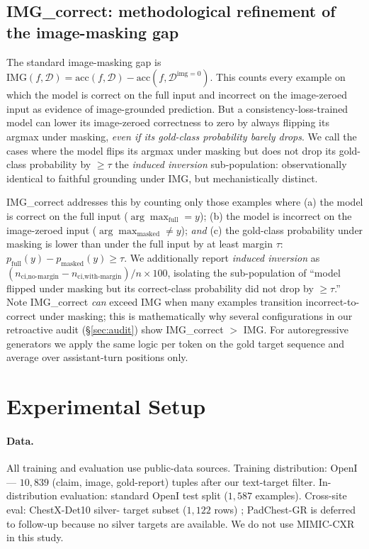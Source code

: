 \documentclass{article}
\begin{document}
\subsection{IMG\_correct: methodological refinement of the image-masking gap}
\label{sec:imgcorrect}

The standard image-masking gap is
$\mathrm{IMG}(f, \mathcal{D}) = \mathrm{acc}(f, \mathcal{D}) - \mathrm{acc}(f, \mathcal{D}^{\mathrm{img}=0})$.
This counts every example on which the model is correct on the full input
and incorrect on the image-zeroed input as evidence of image-grounded
prediction. But a consistency-loss-trained model can lower its image-zeroed
correctness to zero by always flipping its argmax under masking,
\emph{even if its gold-class probability barely drops}. We call the cases
where the model flips its argmax under masking but does not drop its
gold-class probability by $\geq\tau$ the \emph{induced inversion}
sub-population: observationally identical to faithful grounding under IMG,
but mechanistically distinct.

IMG\_correct addresses this by counting only those examples where (a) the
model is correct on the full input ($\arg\max_{\mathrm{full}} = y$);
(b) the model is incorrect on the image-zeroed input
($\arg\max_{\mathrm{masked}} \neq y$); \emph{and} (c) the gold-class
probability under masking is lower than under the full input by at least
margin $\tau$:
$p_{\mathrm{full}}(y) - p_{\mathrm{masked}}(y) \geq \tau$. We additionally
report \emph{induced inversion} as
$(n_{\text{ci,no-margin}} - n_{\text{ci,with-margin}})/n \times 100$,
isolating the sub-population of ``model flipped under masking but its
correct-class probability did not drop by $\geq\tau$.'' Note IMG\_correct
\emph{can} exceed IMG when many examples transition incorrect-to-correct
under masking; this is mathematically why several configurations in our
retroactive audit (\S\ref{sec:audit}) show IMG\_correct $>$ IMG. For
autoregressive generators we apply the same logic per token on the gold
target sequence and average over assistant-turn positions only.

\section{Experimental Setup}
\label{sec:setup}

\paragraph{Data.} All training and evaluation use public-data sources. Training distribution: OpenI
\citep{demner2016openi} --- $10{,}839$ (claim, image, gold-report) tuples
after our text-target filter. In-distribution evaluation: standard OpenI
test split ($1{,}587$ examples). Cross-site eval: ChestX-Det10 silver-
target subset ($1{,}122$ rows) \citep{liu2020chestxdet}; PadChest-GR
\citep{castro2024padchestgr} is deferred to follow-up because no silver
targets are available. We do not use MIMIC-CXR \citep{johnson2019mimiccxr}
in this study.
\end{document}

